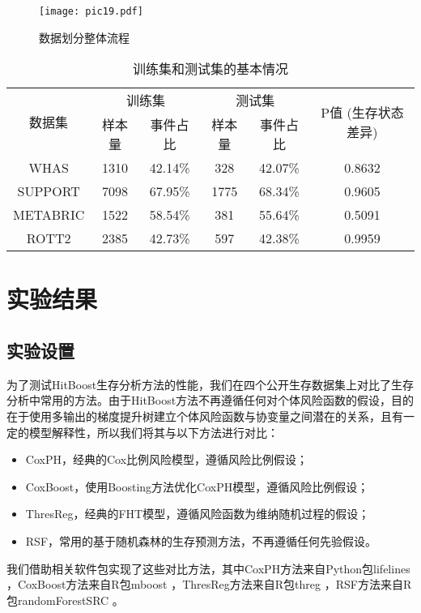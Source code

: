 \begin{figure}[H]
\texttt{[image: pic19.pdf]}
\caption{数据划分整体流程}
\label{pic19}
\end{figure}

\begin{table}[h]
\caption{训练集和测试集的基本情况}
\begin{tabular}{cccccc}
\toprule
\multirow{2}{*}{数据集} & \multicolumn{2}{c}{训练集} & \multicolumn{2}{c}{测试集} & \multirow{2}{*}{P值 (生存状态差异)} \\ \cline{2-5} & 样本量       & 事件占比        & 样本量       & 事件占比        & \\ 
\midrule
WHAS                 & 1310      & 42.14\%     & 328       & 42.07\%     & 0.8632              \\ 
SUPPORT              & 7098      & 67.95\%     & 1775      & 68.34\%     & 0.9605              \\ 
METABRIC             & 1522      & 58.54\%     & 381       & 55.64\%     & 0.5091              \\ 
ROTT2                & 2385      & 42.73\%     & 597       & 42.38\%     & 0.9959              \\ 
\bottomrule
\end{tabular}
\label{table02}
\end{table}

\section{实验结果}

\subsection{实验设置}
为了测试HitBoost生存分析方法的性能，我们在四个公开生存数据集上对比了生存分析中常用的方法。由于HitBoost方法不再遵循任何对个体风险函数的假设，目的在于使用多输出的梯度提升树建立个体风险函数与协变量之间潜在的关系，且有一定的模型解释性，所以我们将其与以下方法进行对比：
\begin{itemize}
  \item CoxPH，经典的Cox比例风险模型，遵循风险比例假设；
  \item CoxBoost，使用Boosting方法优化CoxPH模型，遵循风险比例假设；
  \item ThresReg，经典的FHT模型，遵循风险函数为维纳随机过程的假设；
  \item RSF，常用的基于随机森林的生存预测方法，不再遵循任何先验假设。
\end{itemize}
我们借助相关软件包实现了这些对比方法，其中CoxPH方法来自Python包lifelines ，CoxBoost方法来自R包mboost ，ThresReg方法来自R包threg ，RSF方法来自R包randomForestSRC 。

